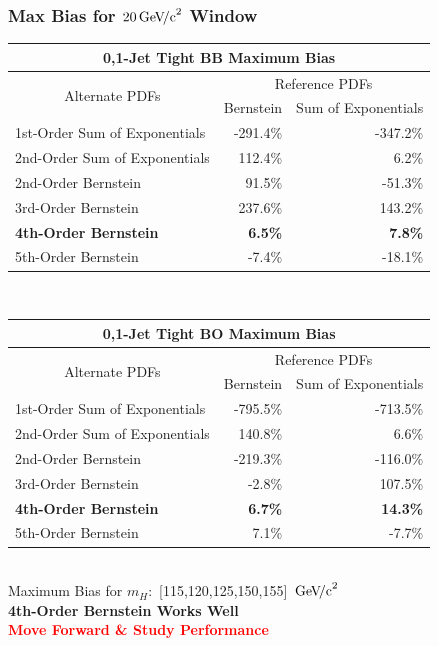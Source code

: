 \documentclass{beamer}
\newcommand{\GeVcc}{\ensuremath{\,\mathrm{Ge\kern -0.1em V\!/c}^2}}
\newcommand{\tredbf}[1]{\textcolor{red}{\bf #1}}
\begin{document}
\begin{frame}
\frametitle{Max Bias for $20\GeVcc{}$ Window}
\tiny
\begin{center}
\begin{tabular}{|l|r|r|} \hline 
\multicolumn{3}{|c|}{ \bf 0,1-Jet Tight BB Maximum Bias} \\ \hline
\multicolumn{1}{|c|}{\multirow{2}{*}{Alternate PDFs}} & \multicolumn{2}{c|}{Reference PDFs} \\ \cline{2-3} 
& \multicolumn{1}{c|}{      Bernstein} & \multicolumn{1}{c|}{Sum of Exponentials}\\ \hline
1st-Order Sum of Exponentials &         -291.4\% &         -347.2\%  \\ \hline
2nd-Order Sum of Exponentials &          112.4\% &            6.2\% \\ \hline
2nd-Order Bernstein &           91.5\% &          -51.3\% \\ \hline
3rd-Order Bernstein &          237.6\% &          143.2\% \\ \hline
\bf 4th-Order Bernstein &     \bf        6.5\% &    \bf         7.8\% \\ \hline
5th-Order Bernstein &           -7.4\% &          -18.1\% \\ \hline
\end{tabular}
\\ \vspace{1em}
\begin{tabular}{|l|r|r|} \hline 
\multicolumn{3}{|c|}{ \bf 0,1-Jet Tight BO Maximum Bias} \\ \hline
\multicolumn{1}{|c|}{\multirow{2}{*}{Alternate PDFs}} & \multicolumn{2}{c|}{Reference PDFs} \\ \cline{2-3} 
& \multicolumn{1}{c|}{      Bernstein} & \multicolumn{1}{c|}{Sum of Exponentials}\\ \hline
1st-Order Sum of Exponentials &         -795.5\% &         -713.5\% \\ \hline
2nd-Order Sum of Exponentials &          140.8\% &            6.6\% \\ \hline
2nd-Order Bernstein &         -219.3\% &         -116.0\% \\ \hline
3rd-Order Bernstein &           -2.8\% &          107.5\% \\ \hline
\bf 4th-Order Bernstein &     \bf        6.7\%  &    \bf        14.3\% \\ \hline
5th-Order Bernstein &            7.1\% &           -7.7\% \\ \hline
\end{tabular}
\\ \vspace{1em}
\scriptsize
Maximum Bias for $m_H:$ [115,120,125,150,155] \GeVcc{}
\\
\small
\bf
4th-Order Bernstein Works Well
\\
\normalsize
\tredbf{
Move Forward \& Study Performance
}
\end{center}
\end{frame}
\end{document}
